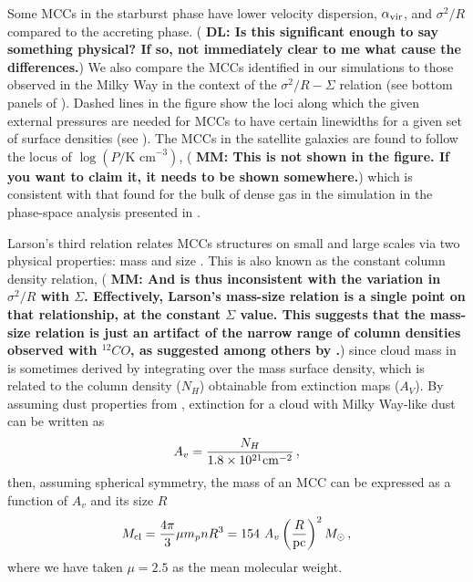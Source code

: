 \IfFileExists{emulateapjlegacy.cls}{\documentclass[iop]{emulateapjlegacy}}{\documentclass[iop]{emulateapj}}
\newcommand{\DL}[1]{({\bf \color{dlcolor} DL: #1})}
\newcommand{\MM}[1]{({\bf \color{mmcolor} MM: #1})}
\begin{document}
Some MCCs in the starburst phase have lower velocity dispersion, $\alpha_{\rm vir}$, and $\sigma^2/R$ compared to the accreting phase. \DL{Is this significant enough to say something physical? If so, not immediately clear to me what cause the differences.}
We also compare the MCCs identified in our simulations to those observed in the Milky Way in the context of the $\sigma^2/R - \Sigma$ relation (see bottom panels of ). Dashed lines in the figure show the loci along which the given external pressures are needed for MCCs to have certain linewidths for a given set of surface densities (see ).
The MCCs in the satellite galaxies are found to follow the locus of
$\log{(P/\textrm{K cm}^{-3})}$, \MM{This is not shown in the
  figure.  If you want to claim it, it needs to be shown somewhere.} which
is consistent with that found for the bulk of dense gas in the simulation in the phase-space analysis presented in \citet{Pallottini17a}.

Larson's third relation relates MCCs structures on small and large
scales via two physical properties: mass and size \citep{Larson81a,
  McKee07a}. This is also known as the constant column density
relation,
\MM{And is thus inconsistent with the variation in $\sigma^2/R$ with
  $\Sigma$.  Effectively, Larson's mass-size relation is a single
  point on that relationship, at the constant $\Sigma$ value.  This
  suggests that the mass-size relation is just an artifact of the
  narrow range of column densities observed with $^{12}CO$, as
  suggested among others by \citet{Ballesteros11}.}
 since cloud mass in \obs is sometimes derived by integrating over the mass surface density, which is related to the column density ($N_H$) obtainable from extinction maps ($A_V$). By assuming dust properties from \citet[][]{weingartner:2001}, extinction for a cloud with Milky Way-like dust can be written as 
\begin{equation}
A_v = \frac{N_H}{1.8 \times 10^{21} {\rm cm}^{-2}}\,,
\end{equation}
then, assuming spherical symmetry, the mass of an MCC can be expressed as a function of $A_v$ and its size $R$
\begin{equation}\label{eqn:constantcolumndensity}
M_{\rm cl} = \frac{4\pi}{3} \mu m_p n R^3 = 154~A_v \left(\frac{R}{\rm pc}\right)^2 \Msun \,,
\end{equation}
where we have taken $\mu = 2.5$ as the mean molecular weight.  
\end{document}

